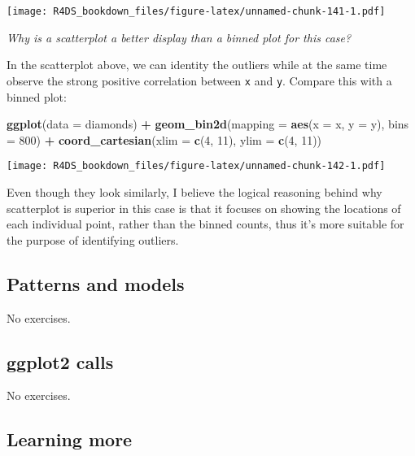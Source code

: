 \documentclass[]{article}
\newenvironment{Shaded}{\begin{snugshade}}{\end{snugshade}}
\newcommand{\KeywordTok}[1]{\textcolor[rgb]{0.13,0.29,0.53}{\textbf{#1}}}
\newcommand{\DataTypeTok}[1]{\textcolor[rgb]{0.13,0.29,0.53}{#1}}
\newcommand{\DecValTok}[1]{\textcolor[rgb]{0.00,0.00,0.81}{#1}}
\newcommand{\StringTok}[1]{\textcolor[rgb]{0.31,0.60,0.02}{#1}}
\newcommand{\OperatorTok}[1]{\textcolor[rgb]{0.81,0.36,0.00}{\textbf{#1}}}
\newcommand{\NormalTok}[1]{#1}
\theoremstyle{definition}
\theoremstyle{definition}
\theoremstyle{definition}
\theoremstyle{remark}
\begin{document}
\texttt{[image: R4DS\_bookdown\_files/figure-latex/unnamed-chunk-141-1.pdf]}

\emph{Why is a scatterplot a better display than a binned plot for this
case?}

In the scatterplot above, we can identity the outliers while at the same
time observe the strong positive correlation between \texttt{x} and
\texttt{y}. Compare this with a binned plot:

\begin{Shaded}
\begin{Highlighting}[]
\KeywordTok{ggplot}\NormalTok{(}\DataTypeTok{data =}\NormalTok{ diamonds) }\OperatorTok{+}
\StringTok{  }\KeywordTok{geom_bin2d}\NormalTok{(}\DataTypeTok{mapping =} \KeywordTok{aes}\NormalTok{(}\DataTypeTok{x =}\NormalTok{ x, }\DataTypeTok{y =}\NormalTok{ y), }\DataTypeTok{bins =} \DecValTok{800}\NormalTok{) }\OperatorTok{+}
\StringTok{  }\KeywordTok{coord_cartesian}\NormalTok{(}\DataTypeTok{xlim =} \KeywordTok{c}\NormalTok{(}\DecValTok{4}\NormalTok{, }\DecValTok{11}\NormalTok{), }\DataTypeTok{ylim =} \KeywordTok{c}\NormalTok{(}\DecValTok{4}\NormalTok{, }\DecValTok{11}\NormalTok{))}
\end{Highlighting}
\end{Shaded}

\texttt{[image: R4DS\_bookdown\_files/figure-latex/unnamed-chunk-142-1.pdf]}

Even though they look similarly, I believe the logical reasoning behind
why scatterplot is superior in this case is that it focuses on showing
the locations of each individual point, rather than the binned counts,
thus it's more suitable for the purpose of identifying outliers.

\subsection{Patterns and models}\label{patterns-and-models}

No exercises.

\subsection{ggplot2 calls}\label{ggplot2-calls}

No exercises.

\subsection{Learning more}\label{learning-more}
\end{document}
